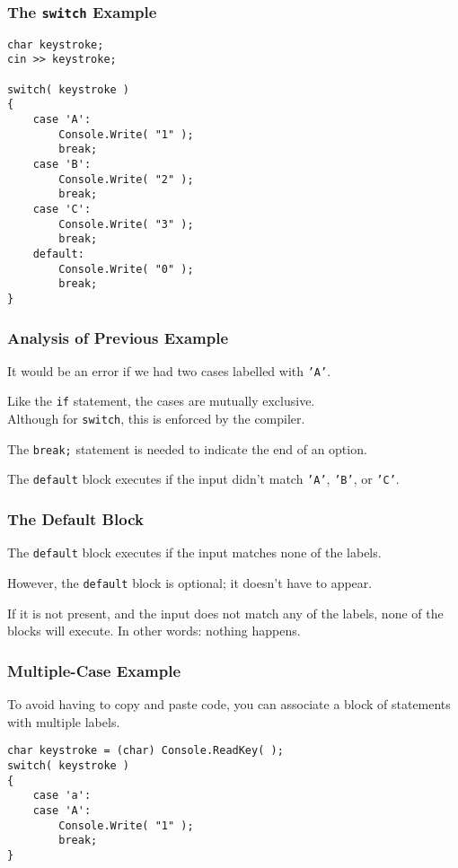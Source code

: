 \begin{frame}[fragile]
\frametitle{The \texttt{switch} Example}

{\scriptsize
\begin{verbatim}
char keystroke;
cin >> keystroke;

switch( keystroke )
{
    case 'A':
        Console.Write( "1" );
        break;
    case 'B':
        Console.Write( "2" );
        break;
    case 'C':
        Console.Write( "3" );
        break;
    default:
        Console.Write( "0" );
        break;
}
\end{verbatim}
}

\end{frame}

\begin{frame}
\frametitle{Analysis of Previous Example}

It would be an error if we had two cases labelled with \texttt{'A'}.

Like the \texttt{if} statement, the cases are mutually exclusive.\\
\quad Although for \texttt{switch}, this is enforced by the compiler.

The \texttt{break;} statement is needed to indicate the end of an option. 

The \texttt{default} block executes if the input didn't match \texttt{'A'}, \texttt{'B'}, or \texttt{'C'}.

\end{frame}

\begin{frame}
\frametitle{The Default Block}
The \texttt{default} block executes if the input matches none of the labels.

However, the \texttt{default} block is optional; it doesn't have to appear.

If it is not present, and the input does not match any of the labels, none of the blocks will execute. In other words: nothing happens.

\end{frame}


\begin{frame}[fragile]
\frametitle{Multiple-Case Example}

To avoid having to copy and paste code, you can associate a block of statements with multiple labels.

\begin{verbatim}
char keystroke = (char) Console.ReadKey( );
switch( keystroke )
{
    case 'a':
    case 'A':
        Console.Write( "1" );
        break;
}
\end{verbatim}
\end{frame}

